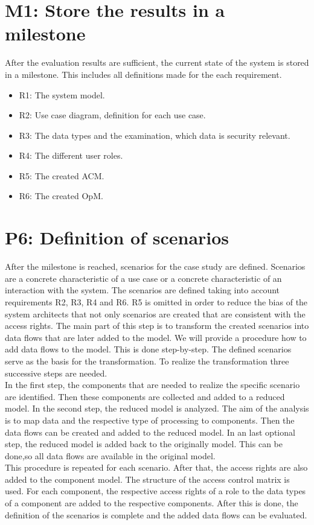 \section{M1: Store the results in a milestone}
After the evaluation results are sufficient, the current state of the system is stored in a milestone. This includes all definitions made for the each requirement.
\begin{itemize}
\item R1: The system model.
\item R2: Use case diagram, definition for each use case.
\item R3: The data types and the examination, which data is security relevant.
\item R4: The different user roles.
\item R5: The created ACM.
\item R6: The created OpM.
\end{itemize}
\section{P6: Definition of scenarios}
After the milestone is reached, scenarios for the case study are defined. Scenarios are a concrete characteristic of a use case or a concrete characteristic of an interaction with the system. The scenarios are defined taking into account requirements R2, R3, R4 and R6. R5 is omitted in order to reduce the bias of the system architects that not only scenarios are created that are consistent with the access rights. The main part of this step is to transform the created scenarios into data flows that are later added to the model. We will provide a procedure how to add data flows to the model. This is done step-by-step. The defined scenarios serve as the basis for the transformation. To realize the transformation three successive steps are needed. \\
In the first step, the components that are needed to realize the specific scenario are identified. Then these components are collected and added to a reduced model.
In the second step, the reduced model is analyzed. The aim of the analysis is to map data and the respective type of processing to components. Then the data flows can be created and added to the reduced model. 
In an last optional step, the reduced model is added back to the originally model. This can be done,so all data flows are available in the original model. \\
This procedure is repeated for each scenario. 
After that, the access rights are also added to the component model. The structure of the access control matrix is used. For each component, the respective access rights of a role to the data types of a component are added to the respective components. After this is done, the definition of the scenarios is complete and the added data flows can be evaluated.
